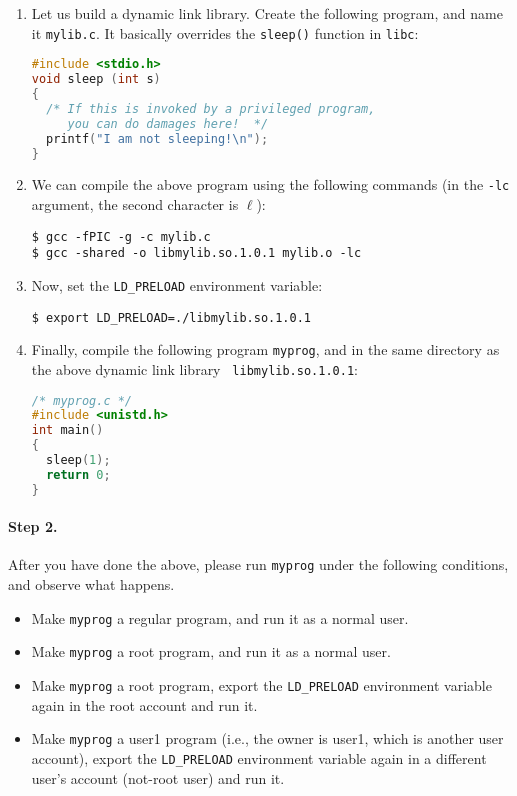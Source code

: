 \begin{enumerate}
  \item Let us build a dynamic link library. Create the following program,
  and name it {\tt mylib.c}. It basically overrides the {\tt sleep()} function
  in {\tt libc}:
\begin{lstlisting}[language=C]
#include <stdio.h>
void sleep (int s)
{
  /* If this is invoked by a privileged program,
     you can do damages here!  */
  printf("I am not sleeping!\n");
}
\end{lstlisting}

  \item We can compile the above program using the following commands (in the
  {\tt -lc} argument, the second character is $\ell$):
\begin{lstlisting}
$ gcc -fPIC -g -c mylib.c
$ gcc -shared -o libmylib.so.1.0.1 mylib.o -lc
\end{lstlisting}



  \item Now, set the {\tt LD\_PRELOAD} environment variable:
\begin{lstlisting}
$ export LD_PRELOAD=./libmylib.so.1.0.1
\end{lstlisting}

  \item Finally, compile the following program {\tt myprog}, and
  in the same directory as the above dynamic link library {\tt
  libmylib.so.1.0.1}:
\begin{lstlisting}[language=C]
/* myprog.c */
#include <unistd.h>
int main()
{
  sleep(1);
  return 0;
}
\end{lstlisting}
\end{enumerate}


\paragraph{Step 2.}
After you have done the above, please run {\tt myprog} under the following
conditions, and observe what happens.

  \begin{itemize}
  \item Make {\tt myprog} a regular program, and run it as a normal user.
  \item Make {\tt myprog} a \setuid root program, and run it as a normal user.
  \item Make {\tt myprog} a \setuid root program, export the {\tt LD\_PRELOAD}
  environment variable again in the root account and run it.

  \item Make {\tt myprog} a \setuid user1 program (i.e., the owner is user1, which
        is another user account), export the {\tt LD\_PRELOAD} environment variable
	again in a different user's account (not-root user) and run it.
  \end{itemize}


